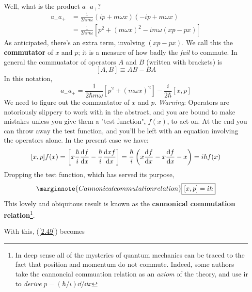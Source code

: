 Well, what is the product $a_-a_+$?
\begin{align*}
	a_-a_+&=\frac{1}{2\hbar m\omega}(ip+m\omega x)(-ip+m\omega x)\\
				&=\frac{1}{2\hbar m\omega}[p^2+(m\omega x)^2-im\omega(xp-px)]
\end{align*}
As anticipated, there's an extra term, involving $(xp-px)$. We call this the \textbf{commutator} of $x$ and $p$; it is a measure of how badly the \textit{fail} to commute. In general the commuatator of operators $A$ and $B$ (written with brackets) is
\begin{equation}\label{2.48}
	[A,B]\equiv AB-BA
\end{equation}
In this notation,
\begin{equation}\label{2.49}
	a_-a_+=\frac{1}{2\hbar m\omega}[p^2+(m\omega x)^2]-\frac{i}{2\hbar}[x,p]
\end{equation}
We need to figure out the commuatator of $x$ and $p$. \textit{Warning}: Operators are notoriously slippery to work with in the abstract, and you are bound to make mistakes unless you give them a "test function", $f(x)$, to act on. At the end you can throw away the test function, and you'll be left with an equation involving the operators alone. In the present case we have:
\begin{equation}\label{2.50}
	[x,p]f(x)=\left[x\frac{\hbar}{i}\dv{f}{x}-\frac{\hbar}{i}\dv{xf}{x}\right]=\frac{\hbar}{i}\left(x\dv{f}{x}-x\dv{f}{x}-x\right)=i\hbar f(x)
\end{equation}
Dropping the test function, which has served its purpose,
\begin{equation}\label{2.51}\marginnote{Cannonical commutation relation}
	\boxed{[x,p]=i\hbar}
\end{equation}
This lovely and obiquitous result is known as the \textbf{cannonical commutation relation}\footnote{In deep sense all of the mysteries of quantum mechanics can be traced to the fact that position and momentum do not commute. Indeed, some authors take the cannoncial commuation relation as an \textit{axiom} of the theory, and use ir to \textit{derive} $p=(\hbar/i)\dd/\dd x$}.

With this, (\ref{2.49}) becomes

